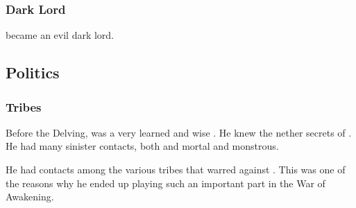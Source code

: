 \subsubsection{Dark Lord}
\Zachirah{} became an evil dark lord. 










\subsection{Politics}





\subsubsection{Tribes}
Before the Delving, \Zachirah was a very learned and wise \resphan.
He knew the nether secrets of \Nyx.
He had many sinister contacts, both \resphan and mortal and monstrous. 

He had contacts among the various tribes that warred against \Merkyrah. 
This was one of the reasons why he ended up playing such an important part in the War of Awakening.























